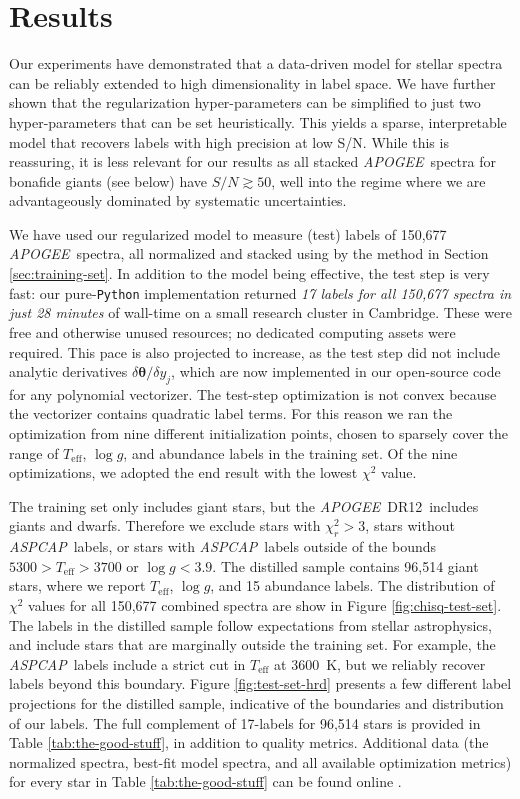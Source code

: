 \documentclass[12pt,preprint]{aastex}
\newcommand{\project}[1]{\textsl{#1}}
\newcommand{\acronym}[1]{{\small{#1}}}
\newcommand{\apogee}{\project{\acronym{APOGEE}}}
\newcommand{\aspcap}{\project{\acronym{ASPCAP}}}
\newcommand{\dr}{\acronym{DR12}}
\newcommand{\logg}{\log g}
\newcommand{\Teff}{T_{\mathrm{eff}}}
\newcommand{\Dvector}[1]{\boldsymbol{#1}}
\newcommand{\vectheta}{\Dvector{\theta}}
\begin{document}
\section{Results}
\label{sec:results}


Our experiments have demonstrated that a data-driven model for stellar spectra
can be reliably extended to high dimensionality in label space.  We have further
shown that the regularization hyper-parameters can be simplified to just two
hyper-parameters that can be set heuristically.  This yields a sparse, interpretable 
model that recovers labels with high precision at low S/N.  While this is 
reassuring, it is less relevant for our results as all stacked \apogee\
spectra for bonafide giants (see below) have $S/N \gtrsim 50$, well into the 
regime where we are advantageously dominated by systematic uncertainties.


We have used our regularized model to measure (test) labels of 150,677 \apogee\ 
spectra, all normalized and stacked using by the method in Section 
\ref{sec:training-set}.  In addition to the model being effective,
the test step is very fast: our pure-\texttt{Python} implementation returned 
\emph{17 labels for all 150,677 spectra in just 28 minutes} of wall-time 
on a small research cluster in Cambridge.  These were free 
and otherwise unused resources; no dedicated computing assets were required.  
This pace is also projected to increase, as the test step did not include 
analytic derivatives $\delta\vectheta/\delta{}y_j$, which are now implemented
in our open-source code for any polynomial vectorizer.  The test-step 
optimization is not convex because the vectorizer contains
quadratic label terms.  For this reason we ran the optimization from nine
different initialization points, chosen to sparsely cover the range of
$\Teff$, $\logg$, and abundance labels in the training set.  Of the nine
optimizations, we adopted the end result with the lowest $\chi^2$ value.


The training set only includes giant stars, but the \apogee\ \dr\ includes 
giants and dwarfs.  Therefore we exclude stars with $\chi_r^2 > 3$, stars without \aspcap\ labels, or stars with \aspcap\ labels outside of the bounds $5300 > \Teff > 3700$ or $\logg < 3.9$.
The distilled sample contains 96,514 giant stars, where we report $\Teff$,
$\logg$, and 15 abundance labels.  The distribution of $\chi^2$ values for
all 150,677 combined spectra are show in Figure \ref{fig:chisq-test-set}.  The
labels in the distilled sample follow expectations from stellar astrophysics,
and include stars that are marginally outside the training set.  For example,
the \aspcap\ labels include a strict cut in $\Teff$ at 3600~K, but we reliably
recover labels beyond this boundary.  Figure \ref{fig:test-set-hrd} presents a
few different label projections for the distilled sample, indicative of the
boundaries and distribution of our labels.  The full complement of 17-labels
for 96,514 stars is provided in Table \ref{tab:the-good-stuff}, in addition
to quality metrics.  Additional data (the normalized spectra, best-fit model
spectra, and all available optimization metrics) for every star in Table 
\ref{tab:the-good-stuff} can be found online \citet{Zenodo}.
\end{document}
